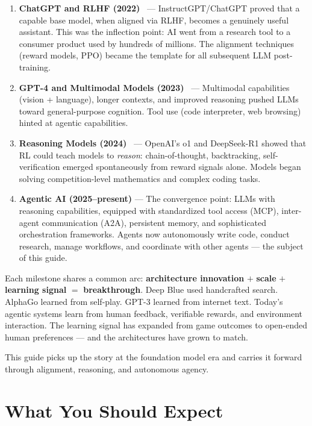 \documentclass[11pt,a4paper,openany]{book}
\begin{document}
\begin{enumerate}
  \item \textbf{ChatGPT and RLHF (2022)}~\cite{ouyang2022training} --- InstructGPT/ChatGPT proved that a capable base model, when aligned via RLHF, becomes a genuinely useful assistant. This was the inflection point: AI went from a research tool to a consumer product used by hundreds of millions. The alignment techniques (reward models, PPO) became the template for all subsequent LLM post-training.
  \item \textbf{GPT-4 and Multimodal Models (2023)}~\cite{openai2023gpt4} --- Multimodal capabilities (vision + language), longer contexts, and improved reasoning pushed LLMs toward general-purpose cognition. Tool use (code interpreter, web browsing) hinted at agentic capabilities.
  \item \textbf{Reasoning Models (2024)}~\cite{deepseek2025r1} --- OpenAI’s o1 and DeepSeek-R1 showed that RL could teach models to \emph{reason}: chain-of-thought, backtracking, self-verification emerged spontaneously from reward signals alone. Models began solving competition-level mathematics and complex coding tasks.
  \item \textbf{Agentic AI (2025--present)} --- The convergence point: LLMs with reasoning capabilities, equipped with standardized tool access (MCP), inter-agent communication (A2A), persistent memory, and sophisticated orchestration frameworks. Agents now autonomously write code, conduct research, manage workflows, and coordinate with other agents --- the subject of this guide.
\end{enumerate}

\begin{intuitionbox}
Each milestone shares a common arc: \textbf{architecture innovation} $+$ \textbf{scale} $+$ \textbf{learning signal} $=$ \textbf{breakthrough}. Deep Blue used handcrafted search. AlphaGo learned from self-play. GPT-3 learned from internet text. Today’s agentic systems learn from human feedback, verifiable rewards, and environment interaction. The learning signal has expanded from game outcomes to open-ended human preferences --- and the architectures have grown to match.
\end{intuitionbox}

This guide picks up the story at the foundation model era and carries it forward through alignment, reasoning, and autonomous agency.

\section*{What You Should Expect}
\label{what-you-should-expect}
\end{document}
